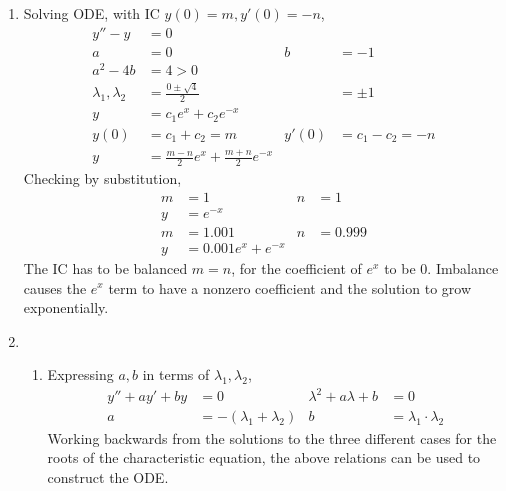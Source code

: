 \begin{enumerate}
    \item Solving ODE, with IC $ y(0) = m , y'(0) = -n$,
          \begin{align}
              y'' - y                  & = 0                                          \\
              a                        & = 0                                        &
              b                        & = -1                                         \\
              a^{2} - 4b               & = 4 > 0                                      \\
              \lambda_{1}, \lambda_{2} & = \frac{0 \pm \sqrt{4}}{2}                 &
                                       & = \pm 1                                      \\
              y                        & = c_{1}e^{x} + c_{2}e^{-x}                   \\
              y(0)                     & = c_{1} + c_{2} = m                        &
              y'(0)                    & = c_{1} - c_{2} = -n                         \\
              y                        & = \frac{m-n}{2}e^{x} + \frac{m+n}{2}e^{-x}
          \end{align}
          Checking by substitution,
          \begin{align}
              m & = 1                   & n & =1      \\
              y & = e^{-x}                            \\
              m & = 1.001               & n & = 0.999 \\
              y & = 0.001e^{x} + e^{-x}
          \end{align}
          The IC has to be balanced $ m = n $, for the coefficient of $ e^{x} $ to be
          $ 0 $. Imbalance causes the $ e^{x} $ term to have a nonzero coefficient
          and the solution to grow exponentially.

    \item
          \begin{enumerate}
              \item Expressing $ a,b $ in terms of $ \lambda_{1}, \lambda_{2} $,
                    \begin{align}
                        y'' + ay' + by             & = 0                             &
                        \lambda^{2} + a\lambda + b & = 0                               \\
                        a                          & = -(\lambda_{1} + \lambda_{2})  &
                        b                          & = \lambda_{1} \cdot \lambda_{2}
                    \end{align}
                    Working backwards from the solutions to the three different cases
                    for the roots of the characteristic equation,
                    the above relations can be used to construct the ODE.


\end{enumerate}
\end{enumerate}
